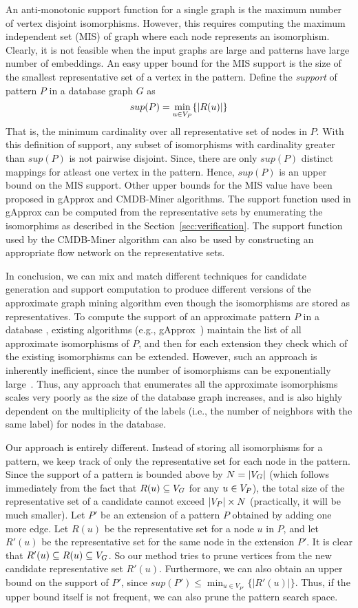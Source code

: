 An anti-monotonic support function for a single graph is the maximum
number of vertex disjoint isomorphisms. However, this requires
computing the maximum independent set (MIS)
of graph where each node represents an isomorphism. Clearly,
it is not feasible when the input graphs are large and patterns have
large number of embeddings. An easy upper bound for the MIS support is the 
size of the smallest representative set of a vertex in the pattern.
Define the {\em
support} of pattern $P$ in a database graph $G$ as 
$$sup(P) = \min_{u \in
V_P} \{ |R(u)| \}$$
That is, the minimum cardinality over all representative set of nodes in $P$. 
With this definition of support, any subset of isomorphisms with cardinality
greater than $sup(P)$ is not pairwise disjoint. Since, there are
only $sup(P)$ distinct mappings for atleast one vertex in the pattern. Hence, $sup(P)$
is an upper bound on the MIS support. Other upper bounds for the MIS value
have been proposed in gApprox and CMDB-Miner algorithms. The support 
function used in gApprox can be computed from the representative sets 
by enumerating the isomorphims as described in the Section~\ref{sec:verification}.
The support function used by the CMDB-Miner algorithm can also be
used by constructing an appropriate flow network on the representative sets.

In conclusion, we can mix and match different techniques for candidate generation
and support computation to produce different versions of the approximate
graph mining algorithm even though the isomorphisms are stored as
representatives.
To compute the support of an approximate pattern $P$ in a database \db,
existing algorithms (e.g., gApprox~\cite{gapprox}) maintain the list of
all approximate isomorphisms of $P$, and then for each extension they
check which of the existing isomorphisms can be extended. However, such an
approach is inherently inefficient, since the number of isomorphisms can
be exponentially large~\cite{2011-icdm}.  Thus, any approach that
enumerates all the approximate isomorphisms scales very poorly as the size
of the database graph increases, and is also highly dependent on the
multiplicity of the labels (i.e., the number of neighbors with the same
label) for nodes in the database.

Our approach is entirely different. Instead of storing all isomorphisms
for a pattern, we keep track of only the representative set for each
node in the pattern.  Since the support of a pattern is bounded above by
$N=|V_G|$ (which follows immediately from the fact that $R(u) \subseteq
V_G$ for any $u \in V_P$), the total size of the representative set of a
candidate cannot exceed $|V_P| \times N$ (practically, it will be much
smaller).  Let $P'$ be an extension of a pattern $P$ obtained by adding
one more edge. Let $R(u)$ be the representative set for a node $u$ in
$P$, and let $R'(u)$ be the representative set for the same node in the
extension $P'$. It is clear that $R'(u) \subseteq R(u) \subseteq V_G$.
So our method tries to prune vertices from the new candidate
representative set $R'(u)$. 
Furthermore, we can also obtain an upper
bound on the support of $P'$, since $sup(P') \le \min_{u \in V_{P'}}
\{|R'(u)|\}$. Thus, if the upper bound itself is not frequent, we can
also prune the pattern search space.
\fi
